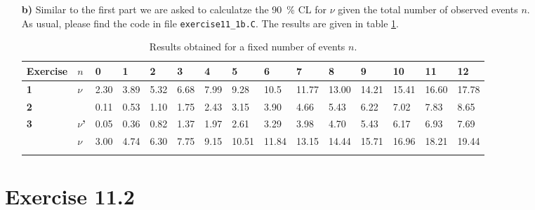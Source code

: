 \documentclass[10pt]{article}
\newenvironment{myfont}{\fontfamily{put}\selectfont}{\par}
\begin{document}
\begin{myfont}
\begin{itemize}
	\item[\textbf{b)}] Similar to the first part we are asked to calculatze the \SI{90}{\percent} CL for $\nu$ given the total number of observed events $n$. \\
	As usual, please find the code in file \texttt{exercise11\_1b.C}.
	The results are given in table \ref{tab:ex1_results_b}.
	
	\begin{longtable}{*{15}l}
		\endfirsthead
		\endhead
		\toprule
		\textbf{Exercise} & \textbf{$n$} & 0 & 1 & 2 & 3 & 4 & 5 & 6 & 7 & 8 & 9 & 10 & 11 & 12 \\
		\midrule
		\textbf{1}                  & \multirow{2}{*}{\textbf{$\nu$}} & 2.30 & 3.89 & 5.32 & 6.68 & 7.99 & 9.28 & 10.5 & 11.77 & 13.00 & 14.21 & 15.41 & 16.60 & 17.78 \\ \cline{3-15}
		\textbf{2}                  &                             & 0.11 & 0.53 & 1.10 & 1.75 & 2.43 & 3.15 & 3.90 & 4.66 & 5.43 & 6.22 & 7.02 & 7.83 & 8.65 \\ \cline{2-15}
		\multirow{2}{*}{\textbf{3}} & \textbf{$\nu$'}                 & 0.05 & 0.36 & 0.82 & 1.37 & 1.97 & 2.61 & 3.29 & 3.98 & 4.70 & 5.43 & 6.17 & 6.93 & 7.69 \\ \cline{3-15}
		                            & \textbf{$\nu$}                  & 3.00 & 4.74 & 6.30 & 7.75 & 9.15 & 10.51 & 11.84 & 13.15 & 14.44 & 15.71 & 16.96 & 18.21 & 19.44 \\
		\bottomrule
		\caption[]{Results obtained for a fixed number of events $n$.}
		\label{tab:ex1_results_b}
	\end{longtable}
\end{itemize}

\section*{Exercise 11.2}



\end{myfont}
\end{document}
